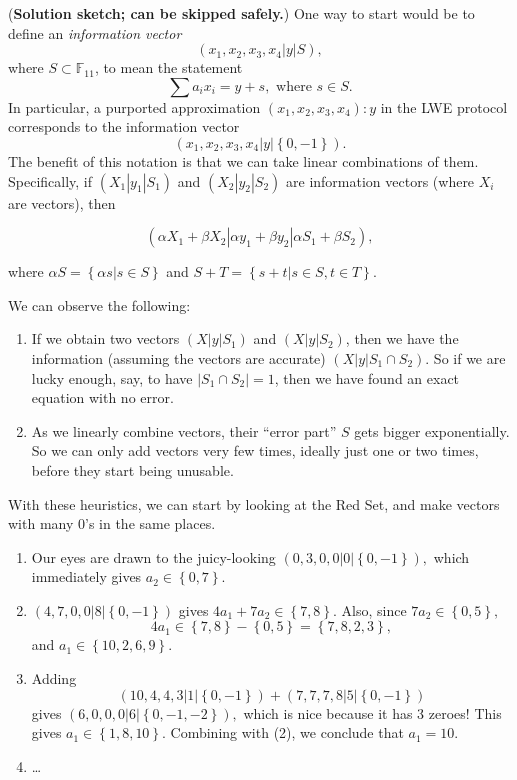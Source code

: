 (\textbf{Solution sketch; can be skipped safely.}) One way to start
would be to define an \emph{information vector}
\[\left( x_{1},x_{2},x_{3},x_{4}|y|S \right),\] where
\(S \subset {\mathbb{F}}_{11}\), to mean the statement
\[\sum a_{i}x_{i} = y + s,\text{ where }s \in S.\] In particular, a
purported approximation \(\left( x_{1},x_{2},x_{3},x_{4} \right):y\) in
the LWE protocol corresponds to the information vector
\[\left( x_{1},x_{2},x_{3},x_{4}|y|\left\{ 0, - 1 \right\} \right).\]
The benefit of this notation is that we can take linear combinations of
them. Specifically, if \(\left( X_{1}\left| y_{1} \right|S_{1} \right)\)
and \(\left( X_{2}\left| y_{2} \right|S_{2} \right)\) are information
vectors (where \(X_{i}\) are vectors), then

\[\left( \alpha X_{1} + \beta X_{2}\left| \alpha y_{1} + \beta y_{2} \right|\alpha S_{1} + \beta S_{2} \right),\]

where \(\alpha S = \left\{ \alpha s|s \in S \right\}\) and
\(S + T = \left\{ s + t|s \in S,t \in T \right\}\).

We can observe the following:

\begin{enumerate}
\item
  If we obtain two vectors \(\left( X|y|S_{1} \right)\) and
  \(\left( X|y|S_{2} \right)\), then we have the information (assuming
  the vectors are accurate) \(\left( X|y|S_{1} \cap S_{2} \right)\). So
  if we are lucky enough, say, to have
  \(\left| S_{1} \cap S_{2} \right| = 1\), then we have found an exact
  equation with no error.
\item
  As we linearly combine vectors, their ``error part'' \(S\) gets bigger
  exponentially. So we can only add vectors very few times, ideally just
  one or two times, before they start being unusable.
\end{enumerate}

With these heuristics, we can start by looking at the Red Set, and make
vectors with many \(0\)'s in the same places.

\begin{enumerate}
\item
  Our eyes are drawn to the juicy-looking
  \(\left( 0,3,0,0|0|\left\{ 0, - 1 \right\} \right),\) which
  immediately gives \(a_{2} \in \left\{ 0,7 \right\}\).
\item
  \(\left( 4,7,0,0|8|\left\{ 0, - 1 \right\} \right)\) gives
  \(4a_{1} + 7a_{2} \in \left\{ 7,8 \right\}.\) Also, since
  \(7a_{2} \in \left\{ 0,5 \right\},\)
  \[4a_{1} \in \left\{ 7,8 \right\} - \left\{ 0,5 \right\} = \left\{ 7,8,2,3 \right\},\]
  and \(a_{1} \in \left\{ 10,2,6,9 \right\}.\)
\item
  Adding
  \[\left( 10,4,4,3|1|\left\{ 0, - 1 \right\} \right) + \left( 7,7,7,8|5|\left\{ 0, - 1 \right\} \right)\]
  gives \(\left( 6,0,0,0|6|\left\{ 0, - 1, - 2 \right\} \right),\) which
  is nice because it has 3 zeroes! This gives
  \(a_{1} \in \left\{ 1,8,10 \right\}.\) Combining with (2), we conclude
  that \(a_{1} = 10.\)
\item
  \ldots{}
\end{enumerate}

